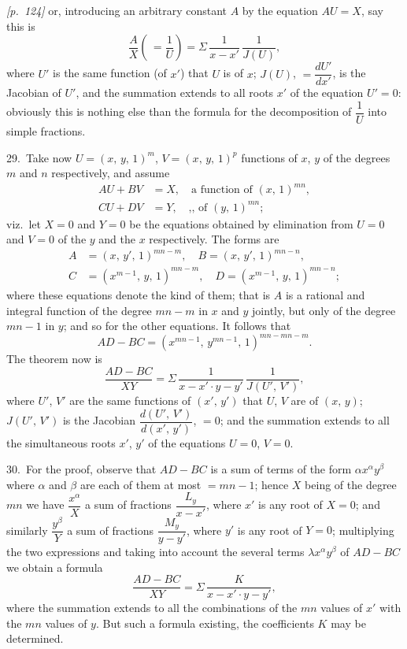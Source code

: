 \documentclass[11pt,a4paper]{article}
\theoremstyle{plain}
\theoremstyle{definition}
\theoremstyle{remark}
\begin{document}
\noindent\textit{[p.~124]} or, introducing an arbitrary constant $A$ by the equation $AU = X$, say this is
\[
\frac{A}{X}\left(\,= \frac{1}{U}\right) = \Sigma\,\frac{1}{x - x'}\,\frac{1}{J(U)},
\]
where $U'$ is the same function (of $x'$) that $U$ is of $x$; $J(U)$, $= \dfrac{dU'}{dx'}$, is the Jacobian of $U'$, and the summation extends to all roots $x'$ of the equation $U' = 0$: obviously this is nothing else than the formula for the decomposition of $\dfrac{1}{U}$ into simple fractions.

29.\ Take now $U = (x,\,y,\,1)^m$, $V = (x,\,y,\,1)^p$ functions of $x$, $y$ of the degrees $m$ and $n$ respectively, and assume
\begin{align*}
AU + BV &= X,\quad \text{a function of }(x,\,1)^{mn},\\
CU + DV &= Y,\quad \text{,, of }(y,\,1)^{mn};
\end{align*}
viz.\ let $X = 0$ and $Y = 0$ be the equations obtained by elimination from $U = 0$ and $V = 0$ of the $y$ and the $x$ respectively. The forms are
\begin{align*}
A &= (x,\,y',\,1)^{mn - m},\quad B = (x,\,y',\,1)^{mn - n},\\
C &= (x^{m-1},\,y,\,1)^{mn-m},\quad D = (x^{m-1},\,y,\,1)^{mn-n};
\end{align*}
where these equations denote the kind of them; that is $A$ is a rational and integral function of the degree $mn - m$ in $x$ and $y$ jointly, but only of the degree $mn - 1$ in $y$; and so for the other equations. It follows that
\[
AD - BC = (x^{mn-1},\,y^{mn-1},\,1)^{mn-mn-m}.
\]
The theorem now is
\[
\frac{AD - BC}{XY} = \Sigma\,\frac{1}{x - x'\cdot y - y'}\,\frac{1}{J(U',\,V')},
\]
where $U'$, $V'$ are the same functions of $(x',\,y')$ that $U$, $V$ are of $(x,\,y)$; $J(U',\,V')$ is the Jacobian $\dfrac{d(U',\,V')}{d(x',\,y')}$, $= 0$; and the summation extends to all the simultaneous roots $x'$, $y'$ of the equations $U = 0$, $V = 0$.

30.\ For the proof, observe that $AD - BC$ is a sum of terms of the form $\alpha x^\alpha y^\beta$ where $\alpha$ and $\beta$ are each of them at most $= mn - 1$; hence $X$ being of the degree $mn$ we have $\dfrac{x^\alpha}{X}$ a sum of fractions $\dfrac{L_y}{x - x'}$, where $x'$ is any root of $X = 0$; and similarly $\dfrac{y^\beta}{Y}$ a sum of fractions $\dfrac{M_y}{y - y'}$, where $y'$ is any root of $Y = 0$; multiplying the two expressions and taking into account the several terms $\lambda x^\alpha y^\beta$ of $AD - BC$ we obtain a formula
\[
\frac{AD - BC}{XY} = \Sigma\,\frac{K}{x - x'\cdot y - y'},
\]
where the summation extends to all the combinations of the $mn$ values of $x'$ with the $mn$ values of $y$. But such a formula existing, the coefficients $K$ may be determined.
\end{document}
